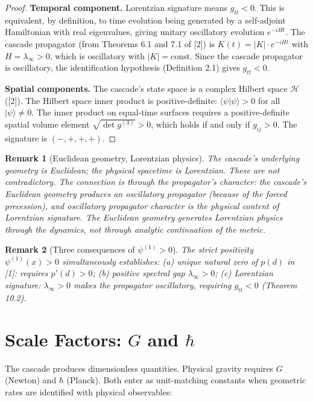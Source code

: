 \documentclass[12pt,a4paper]{article}
\newtheorem*{remark}{Remark}
\begin{document}
\begin{proof}
\textbf{Temporal component.} Lorentzian signature means $g_{tt} < 0$. This is equivalent,
by definition, to time evolution being generated by a self-adjoint Hamiltonian with real
eigenvalues, giving unitary oscillatory evolution $e^{-iHt}$. The cascade propagator (from
Theorems 6.1 and 7.1 of [2]) is $K(t) = |K| \cdot e^{-iHt}$ with $H = \lambda_\infty > 0$, which is oscillatory
with $|K| = \text{const}$. Since the cascade propagator is oscillatory, the identification hypothesis
(Definition 2.1) gives $g_{tt} < 0$.

\textbf{Spatial components.} The cascade's state space is a complex Hilbert space $\mathcal{H}$ ([2]).
The Hilbert space inner product is positive-definite: $\langle\psi|\psi\rangle > 0$ for all $|\psi\rangle \neq 0$. The
inner product on equal-time surfaces requires a positive-definite spatial volume element
$\sqrt{\det g^{(3)}} > 0$, which holds if and only if $g_{ij} > 0$. The signature is $(-,+,+,+)$.
\end{proof}

\begin{remark}[Euclidean geometry, Lorentzian physics]
The cascade's underlying geometry is Euclidean; the physical spacetime is Lorentzian. These are not contradictory. The
connection is through the propagator's character: the cascade's Euclidean geometry produces
an oscillatory propagator (because of the forced precession), and oscillatory propagator
character is the physical content of Lorentzian signature. The Euclidean geometry generates
Lorentzian physics through the dynamics, not through analytic continuation of the metric.
\end{remark}

\begin{remark}[Three consequences of $\psi^{(1)} > 0$]
The strict positivity $\psi^{(1)}(x) > 0$ simultaneously establishes: (a) unique natural zero of $p(d)$ in [1]: requires $p'(d) > 0$; (b) positive
spectral gap $\lambda_\infty > 0$; (c) Lorentzian signature: $\lambda_\infty > 0$ makes the propagator oscillatory,
requiring $g_{tt} < 0$ (Theorem 10.2).
\end{remark}

\section{Scale Factors: $G$ and $\hbar$}

The cascade produces dimensionless quantities. Physical gravity requires $G$ (Newton) and
$\hbar$ (Planck). Both enter as unit-matching constants when geometric rates are identified
with physical observables:
\end{document}
